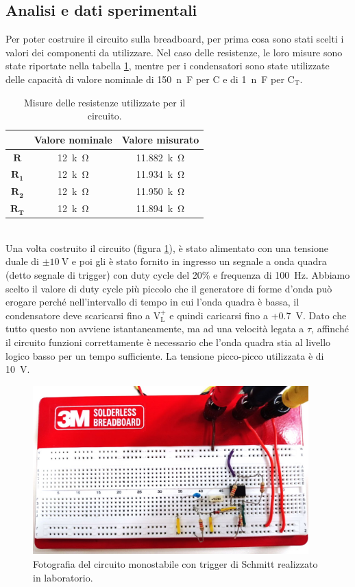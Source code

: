 \documentclass{report}
\begin{document}
\subsection{Analisi e dati sperimentali}
Per poter costruire il circuito sulla breadboard, per prima cosa sono stati scelti i valori dei componenti da utilizzare. Nel caso delle resistenze, le loro misure sono state riportate nella tabella \ref{table:mis_res1}, mentre per i condensatori sono state utilizzate delle capacità di valore nominale di \SI{150}{n\farad} per C e di \SI{1}{n\farad} per $\mathrm{C_T}$. 
\begin{table}[h!]
	\centering
	\begin{tabular}{|c|c|c|}
		\cline{2-3} 
		\multicolumn{1}{c|}{} & \textbf{Valore nominale} & \textbf{Valore misurato}\\ 
		\hline
		$\mathbf{R}$ & \SI{12}{k\ohm} & \SI{11.882}{k\ohm} \\ 
		\hline
		$\mathbf{R_1}$ & \SI{12}{k\ohm} & \SI{11.934}{k\ohm} \\ 
		\hline
		$\mathbf{R_2}$ & \SI{12}{k\ohm} & \SI{11.950}{k\ohm} \\ 
		\hline
		$\mathbf{R_T}$ & \SI{12}{k\ohm} & \SI{11.894}{k\ohm} \\ 
		\hline
	\end{tabular}
	\caption{Misure delle resistenze utilizzate per il circuito.}
	\label{table:mis_res1}
\end{table}
\\Una volta costruito il circuito (figura \ref{figura:circuito1}), è stato alimentato con una tensione duale di $\mathrm{\pm\SI{10}{\volt}}$ e poi gli è stato fornito in ingresso un segnale a onda quadra (detto segnale di trigger) con duty cycle del 20\% e frequenza di \SI{100}{\hertz}. Abbiamo scelto il valore di duty cycle più piccolo che il generatore di forme d'onda può erogare perché nell'intervallo di tempo in cui l'onda quadra è bassa, il condensatore deve scaricarsi fino a $\mathrm{V_L^+}$ e quindi caricarsi fino a +\SI{0.7}{\volt}. Dato che tutto questo non avviene istantaneamente, ma ad una velocità legata a $\tau$, affinché il circuito funzioni correttamente è necessario che l'onda quadra stia al livello logico basso per un tempo sufficiente. La tensione picco-picco utilizzata è di \SI{10}{\volt}.\\ %
\begin{figure}[h!]
	\centering
	\includegraphics[height=6.5cm]{immagini/circuito1}
	\caption{Fotografia del circuito monostabile con trigger di Schmitt realizzato in laboratorio.}
	\label{figura:circuito1}
\end{figure}
\end{document}
